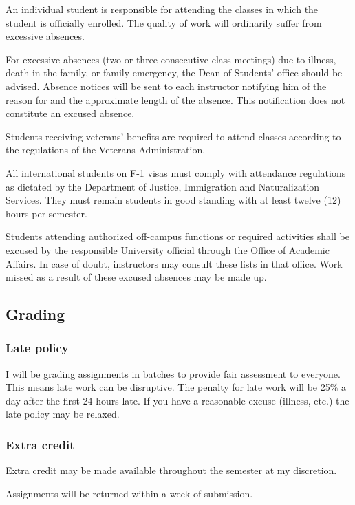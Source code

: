 \documentclass[11pt,]{article}
\begin{document}
An individual student is responsible for attending the classes in which
the student is officially enrolled. The quality of work will ordinarily
suffer from excessive absences.

For excessive absences (two or three consecutive class meetings) due to
illness, death in the family, or family emergency, the Dean of Students'
office should be advised. Absence notices will be sent to each
instructor notifying him of the reason for and the approximate length of
the absence. This notification does not constitute an excused absence.

Students receiving veterans' benefits are required to attend classes
according to the regulations of the Veterans Administration.

All international students on F-1 visas must comply with attendance
regulations as dictated by the Department of Justice, Immigration and
Naturalization Services. They must remain students in good standing with
at least twelve (12) hours per semester.

Students attending authorized off-campus functions or required
activities shall be excused by the responsible University official
through the Office of Academic Affairs. In case of doubt, instructors
may consult these lists in that office. Work missed as a result of these
excused absences may be made up.

\subsection{Grading}\label{grading}

\subsubsection{Late policy}\label{late-policy}

I will be grading assignments in batches to provide fair assessment to
everyone. This means late work can be disruptive. The penalty for late
work will be 25\% a day after the first 24 hours late. If you have a
reasonable excuse (illness, etc.) the late policy may be relaxed.

\subsubsection{Extra credit}\label{extra-credit}

Extra credit may be made available throughout the semester at my
discretion.

Assignments will be returned within a week of submission.
\end{document}
